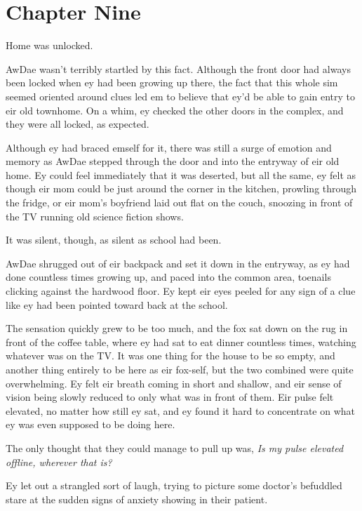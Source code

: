 \chapter*{Chapter Nine}

Home was unlocked.

AwDae wasn't terribly startled by this fact.  Although the front door had always been locked when ey had been growing up there, the fact that this whole sim seemed oriented around clues led em to believe that ey'd be able to gain entry to eir old townhome.  On a whim, ey checked the other doors in the complex, and they were all locked, as expected.

Although ey had braced emself for it, there was still a surge of emotion and memory as AwDae stepped through the door and into the entryway of eir old home.  Ey could feel immediately that it was deserted, but all the same, ey felt as though eir mom could be just around the corner in the kitchen, prowling through the fridge, or eir mom's boyfriend laid out flat on the couch, snoozing in front of the TV running old science fiction shows.

It was silent, though, as silent as school had been.

AwDae shrugged out of eir backpack and set it down in the entryway, as ey had done countless times growing up, and paced into the common area, toenails clicking against the hardwood floor.  Ey kept eir eyes peeled for any sign of a clue like ey had been pointed toward back at the school.

The sensation quickly grew to be too much, and the fox sat down on the rug in front of the coffee table, where ey had sat to eat dinner countless times, watching whatever was on the TV.  It was one thing for the house to be so empty, and another thing entirely to be here as eir fox-self, but the two combined were quite overwhelming.  Ey felt eir breath coming in short and shallow, and eir sense of vision being slowly reduced to only what was in front of them.  Eir pulse felt elevated, no matter how still ey sat, and ey found it hard to concentrate on what ey was even supposed to be doing here.

The only thought that they could manage to pull up was, \textit{Is my pulse elevated offline, wherever that is?}

Ey let out a strangled sort of laugh, trying to picture some doctor's befuddled stare at the sudden signs of anxiety showing in their patient.

